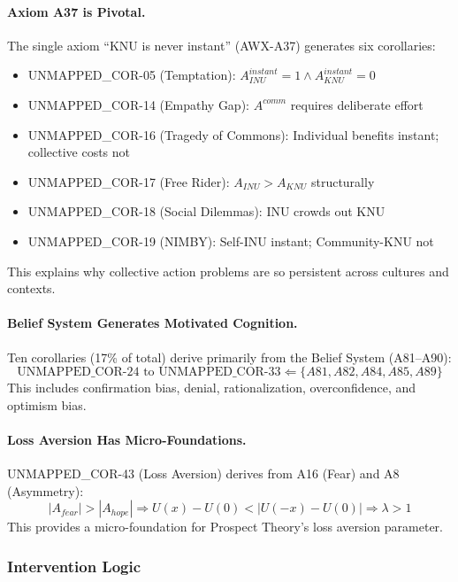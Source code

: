 \paragraph{Axiom A37 is Pivotal.}
The single axiom ``KNU is never instant'' (AWX-A37) generates six corollaries:
\begin{itemize}
\item UNMAPPED_COR-05 (Temptation): $A_{INU}^{instant} = 1 \land A_{KNU}^{instant} = 0$
\item UNMAPPED_COR-14 (Empathy Gap): $A^{comm}$ requires deliberate effort
\item UNMAPPED_COR-16 (Tragedy of Commons): Individual benefits instant; collective costs not
\item UNMAPPED_COR-17 (Free Rider): $A_{INU} > A_{KNU}$ structurally
\item UNMAPPED_COR-18 (Social Dilemmas): INU crowds out KNU
\item UNMAPPED_COR-19 (NIMBY): Self-INU instant; Community-KNU not
\end{itemize}
This explains why collective action problems are so persistent across cultures and contexts.

\paragraph{Belief System Generates Motivated Cognition.}
Ten corollaries (17\% of total) derive primarily from the Belief System (A81--A90):
\begin{equation}
\text{UNMAPPED_COR-24 to UNMAPPED_COR-33} \Leftarrow \{A81, A82, A84, A85, A89\}
\end{equation}
This includes confirmation bias, denial, rationalization, overconfidence, and optimism bias.

\paragraph{Loss Aversion Has Micro-Foundations.}
UNMAPPED_COR-43 (Loss Aversion) derives from A16 (Fear) and A8 (Asymmetry):
\begin{equation}
|A_{fear}| > |A_{hope}| \Rightarrow U(x) - U(0) < |U(-x) - U(0)| \Rightarrow \lambda > 1
\end{equation}
This provides a micro-foundation for Prospect Theory's loss aversion parameter.

\subsubsection{Intervention Logic}

